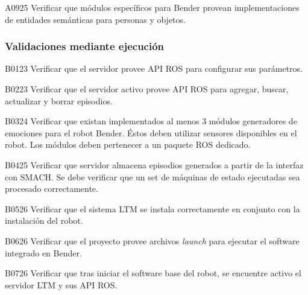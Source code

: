 \begin{def-validacion}{A}{09}{25}
	Verificar que módulos específicos para Bender provean implementaciones de entidades semánticas para personas y objetos.
\end{def-validacion}




\subsubsection{Validaciones mediante ejecución}

\begin{def-validacion}{B}{01}{23}
	Verificar que el servidor provee API ROS para configurar sus parámetros.	
\end{def-validacion}

\begin{def-validacion}{B}{02}{23}
	Verificar que el servidor activo provee API ROS para agregar, buscar, actualizar y borrar episodios. 	
\end{def-validacion}

\begin{def-validacion}{B}{03}{24}
	Verificar que existan implementados al menos 3 módulos generadores de emociones para el robot Bender. Éstos deben utilizar sensores disponibles en el robot. Los módulos deben pertenecer a un paquete ROS dedicado.	
\end{def-validacion}

\begin{def-validacion}{B}{04}{25}
	Verificar que servidor almacena episodios generados a partir de la interfaz con SMACH. Se debe verificar que un set de máquinas de estado ejecutadas sea procesado correctamente.	
\end{def-validacion}

\begin{def-validacion}{B}{05}{26}
Verificar que el sistema LTM se instala correctamente en conjunto con la instalación del robot.	
\end{def-validacion}

\begin{def-validacion}{B}{06}{26}
	Verificar que el proyecto provee archivos \textit{launch} para ejecutar el software integrado en Bender.
\end{def-validacion}

\begin{def-validacion}{B}{07}{26}
Verificar que tras iniciar el software base del robot, se encuentre activo el servidor LTM y sus API ROS.
\end{def-validacion}



